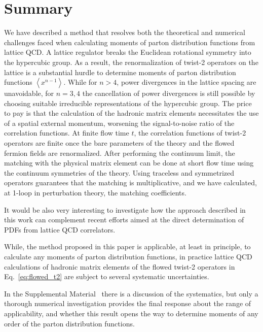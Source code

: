 \section{Summary}
We have described a method that resolves both the theoretical
and numerical challenges faced when calculating moments
of parton distribution functions from lattice QCD.
A lattice regulator breaks the
Euclidean rotational symmetry into the hypercubic group.
As a result, the renormalization of twist-2 operators
on the lattice is a substantial hurdle to determine
moments of parton distribution functions
$\left\langle x^{n-1} \right\rangle$.
While for $n>4$, power divergences in the
lattice spacing are unavoidable, for $n=3,4$
the cancellation of power divergences is still possible
by choosing suitable irreducible representations
of the hypercubic group. The price to pay is that
the calculation of the hadronic matrix elements
necessitates the use
of a spatial external momentum, worsening the signal-to-noise
ratio of the correlation functions.
At finite flow time $t$, the correlation functions
of twist-2 operators
are finite once the bare parameters of the theory and the flowed fermion
fields are renormalized.
After performing the continuum limit,
the matching with the physical matrix element can be done
at short flow time using the continuum symmetries of the theory.
Using traceless and symmetrized operators guarantees that the
matching is multiplicative, and we have calculated, at
1-loop in perturbation theory, the matching coefficients.

It would be also very interesting
to investigate how the approach described in this work
can complement recent efforts aimed at the direct
determination of PDFs from lattice QCD correlators.

While, the method proposed in this paper is applicable,
at least in principle, to calculate any moments
of parton distribution functions,
in practice lattice QCD calculations of hadronic matrix elements of
the flowed twist-2 operators in Eq.~\eqref{eq:flowed_t2} are subject to
several systematic uncertainties.

In the Supplemental Material~\cite{SupplMat} there is a discussion of the
systematics, but only a thorough numerical investigation
provides the final response about the
range of applicability, and whether
this result opens the way to determine moments of any order
of the parton distribution functions.
